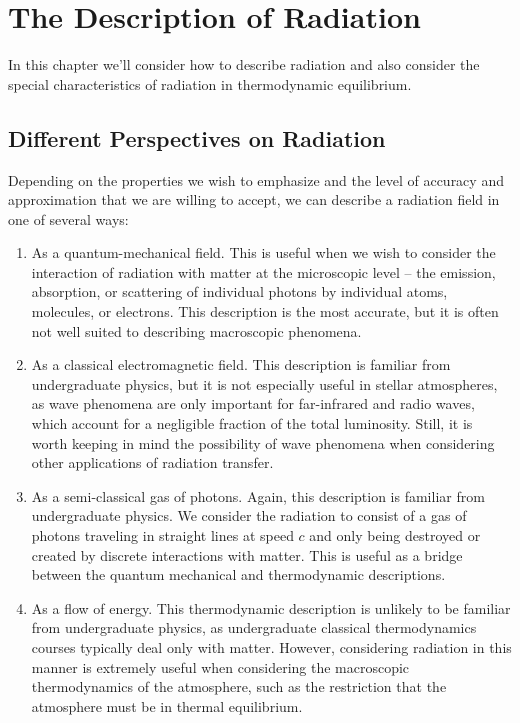 
\chapter{The Description of Radiation}
\label{chapter:description}

\noindent
In this chapter we'll consider how to describe radiation and also
consider the special characteristics of radiation in thermodynamic
equilibrium.

\newslide

\section{Different Perspectives on Radiation}

Depending on the properties we wish to emphasize and the level of
accuracy and approximation that we are willing to accept, we can
describe a radiation field in one of several ways:

\newslide

\begin{enumerate}

\item As a quantum-mechanical field. This is useful when we wish to
  consider the interaction of radiation with matter at the microscopic
  level -- the emission, absorption, or scattering of individual photons
  by individual atoms, molecules, or electrons. This description is the
  most accurate, but it is often not well suited to describing
  macroscopic phenomena.

\newslide

\item As a classical electromagnetic field. This description is familiar
  from undergraduate physics, but it is not especially useful in stellar
  atmospheres, as wave phenomena are only important for far-infrared and
  radio waves, which account for a negligible fraction of the total
  luminosity. Still, it is worth keeping in mind the possibility of wave
  phenomena when considering other applications of radiation transfer.

\newslide

\item As a semi-classical gas of photons. Again, this description is
  familiar from undergraduate physics. We consider the radiation to
  consist of a gas of photons traveling in straight lines at speed $c$
  and only being destroyed or created by discrete interactions with
  matter. This is useful as a bridge between the quantum mechanical and
  thermodynamic descriptions.

\newslide

\item As a flow of energy. This thermodynamic description is unlikely to
  be familiar from undergraduate physics, as undergraduate classical
  thermodynamics courses typically deal only with matter. However,
  considering radiation in this manner is extremely useful when
  considering the macroscopic thermodynamics of the atmosphere, such as
  the restriction that the atmosphere must be in thermal equilibrium.

\end{enumerate}

